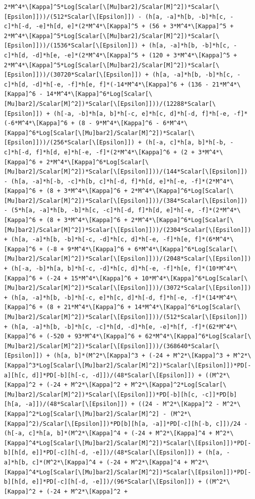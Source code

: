 \documentclass[11pt]{article}
\begin{document}
\begin{verbatim}
2*M^4*\[Kappa]^5*Log[Scalar[\[Mu]bar2]/Scalar[M]^2])*Scalar[\[Epsilon]]))/(512*Scalar[\[Epsilon]]) - (h[a, -a]*h[b, -b]*h[c, -c]*h[-d, -e]*h[d, e]*(2*M^4*\[Kappa]^5 + (56 + 3*M^4*\[Kappa]^5 + 2*M^4*\[Kappa]^5*Log[Scalar[\[Mu]bar2]/Scalar[M]^2])*Scalar[\[Epsilon]]))/(1536*Scalar[\[Epsilon]]) + (h[a, -a]*h[b, -b]*h[c, -c]*h[d, -d]*h[e, -e]*(2*M^4*\[Kappa]^5 + (120 + 3*M^4*\[Kappa]^5 + 2*M^4*\[Kappa]^5*Log[Scalar[\[Mu]bar2]/Scalar[M]^2])*Scalar[\[Epsilon]]))/(30720*Scalar[\[Epsilon]]) + (h[a, -a]*h[b, -b]*h[c, -c]*h[d, -d]*h[-e, -f]*h[e, f]*(-14*M^4*\[Kappa]^6 + (136 - 21*M^4*\[Kappa]^6 - 14*M^4*\[Kappa]^6*Log[Scalar[\[Mu]bar2]/Scalar[M]^2])*Scalar[\[Epsilon]]))/(12288*Scalar[\[Epsilon]]) + (h[-a, -b]*h[a, b]*h[-c, e]*h[c, d]*h[-d, f]*h[-e, -f]*(-6*M^4*\[Kappa]^6 + (8 - 9*M^4*\[Kappa]^6 - 6*M^4*\[Kappa]^6*Log[Scalar[\[Mu]bar2]/Scalar[M]^2])*Scalar[\[Epsilon]]))/(256*Scalar[\[Epsilon]]) + (h[-a, c]*h[a, b]*h[-b, -c]*h[-d, f]*h[d, e]*h[-e, -f]*(2*M^4*\[Kappa]^6 + (2 + 3*M^4*\[Kappa]^6 + 2*M^4*\[Kappa]^6*Log[Scalar[\[Mu]bar2]/Scalar[M]^2])*Scalar[\[Epsilon]]))/(144*Scalar[\[Epsilon]]) - (h[a, -a]*h[-b, -c]*h[b, c]*h[-d, f]*h[d, e]*h[-e, -f]*(2*M^4*\[Kappa]^6 + (8 + 3*M^4*\[Kappa]^6 + 2*M^4*\[Kappa]^6*Log[Scalar[\[Mu]bar2]/Scalar[M]^2])*Scalar[\[Epsilon]]))/(384*Scalar[\[Epsilon]]) - (5*h[a, -a]*h[b, -b]*h[c, -c]*h[-d, f]*h[d, e]*h[-e, -f]*(2*M^4*\[Kappa]^6 + (8 + 3*M^4*\[Kappa]^6 + 2*M^4*\[Kappa]^6*Log[Scalar[\[Mu]bar2]/Scalar[M]^2])*Scalar[\[Epsilon]]))/(2304*Scalar[\[Epsilon]]) + (h[a, -a]*h[b, -b]*h[-c, -d]*h[c, d]*h[-e, -f]*h[e, f]*(6*M^4*\[Kappa]^6 + (-8 + 9*M^4*\[Kappa]^6 + 6*M^4*\[Kappa]^6*Log[Scalar[\[Mu]bar2]/Scalar[M]^2])*Scalar[\[Epsilon]]))/(2048*Scalar[\[Epsilon]]) + (h[-a, -b]*h[a, b]*h[-c, -d]*h[c, d]*h[-e, -f]*h[e, f]*(10*M^4*\[Kappa]^6 + (-24 + 15*M^4*\[Kappa]^6 + 10*M^4*\[Kappa]^6*Log[Scalar[\[Mu]bar2]/Scalar[M]^2])*Scalar[\[Epsilon]]))/(3072*Scalar[\[Epsilon]]) + (h[a, -a]*h[b, -b]*h[-c, e]*h[c, d]*h[-d, f]*h[-e, -f]*(14*M^4*\[Kappa]^6 + (8 + 21*M^4*\[Kappa]^6 + 14*M^4*\[Kappa]^6*Log[Scalar[\[Mu]bar2]/Scalar[M]^2])*Scalar[\[Epsilon]]))/(512*Scalar[\[Epsilon]]) + (h[a, -a]*h[b, -b]*h[c, -c]*h[d, -d]*h[e, -e]*h[f, -f]*(62*M^4*\[Kappa]^6 + (-520 + 93*M^4*\[Kappa]^6 + 62*M^4*\[Kappa]^6*Log[Scalar[\[Mu]bar2]/Scalar[M]^2])*Scalar[\[Epsilon]]))/(368640*Scalar[\[Epsilon]]) + (h[a, b]*(M^2*\[Kappa]^3 + (-24 + M^2*\[Kappa]^3 + M^2*\[Kappa]^3*Log[Scalar[\[Mu]bar2]/Scalar[M]^2])*Scalar[\[Epsilon]])*PD[-a][h[c, d]]*PD[-b][h[-c, -d]])/(48*Scalar[\[Epsilon]]) + ((M^2*\[Kappa]^2 + (-24 + M^2*\[Kappa]^2 + M^2*\[Kappa]^2*Log[Scalar[\[Mu]bar2]/Scalar[M]^2])*Scalar[\[Epsilon]])*PD[-b][h[c, -c]]*PD[b][h[a, -a]])/(48*Scalar[\[Epsilon]]) + ((24 - M^2*\[Kappa]^2 - M^2*\[Kappa]^2*Log[Scalar[\[Mu]bar2]/Scalar[M]^2] - (M^2*\[Kappa]^2)/Scalar[\[Epsilon]])*PD[b][h[a, -a]]*PD[-c][h[-b, c]])/24 - (h[-a, c]*h[a, b]*(M^2*\[Kappa]^4 + (-24 + M^2*\[Kappa]^4 + M^2*\[Kappa]^4*Log[Scalar[\[Mu]bar2]/Scalar[M]^2])*Scalar[\[Epsilon]])*PD[-b][h[d, e]]*PD[-c][h[-d, -e]])/(48*Scalar[\[Epsilon]]) + (h[a, -a]*h[b, c]*(M^2*\[Kappa]^4 + (-24 + M^2*\[Kappa]^4 + M^2*\[Kappa]^4*Log[Scalar[\[Mu]bar2]/Scalar[M]^2])*Scalar[\[Epsilon]])*PD[-b][h[d, e]]*PD[-c][h[-d, -e]])/(96*Scalar[\[Epsilon]]) + ((M^2*\[Kappa]^2 + (-24 + M^2*\[Kappa]^2 + 
\end{verbatim}
\end{document}
